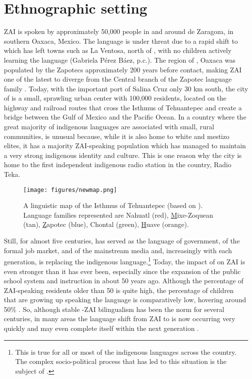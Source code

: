 \section{Ethnographic setting}

ZAI is spoken by approximately 50,000 people in and around  de Zaragoza, in southern Oaxaca, Mexico. The language is under threat due to a rapid shift to  which has left towns such as La Ventosa, north of , with no children actively learning the language (Gabriela P\'{e}rez B\'{a}ez, p.c.). The region of , Oaxaca was populated by the Zapotecs approximately 200 years before  contact, making ZAI one of the latest to diverge from the Central branch of the Zapotec language family \citep{rendon1995}. Today, with the important port of Salina Cruz only 30 km south, the city of  is a small, sprawling urban center with 100,000 residents, located on the highway and railroad routes that cross the Isthmus of Tehuantepec and create a bridge between the Gulf of Mexico and the Pacific Ocean. In a country where the great majority of indigenous languages are associated with small, rural communities,  is unusual because, while it is also home to white and mestizo elites, it has a majority ZAI-speaking population which has managed to maintain a very strong indigenous identity and culture. This is one reason why the city is home to the first independent indigenous radio station in the country, Radio Teka. 

\begin{figure}
\texttt{[image: figures/newmap.png]}
\caption{{A linguistic map of the Isthmus of Tehuantepec (based on \citealt{lewis2016})}. Language families represented are
Nahuatl (red),
\ul{M}ixe-Zoquean (tan),
\ul{Z}apotec (blue),
Chontal (green),
\ul{H}uave (orange).
}
\end{figure}


\largerpage[-1]
Still, for almost five centuries,  has served as the language of government, of the formal job market, and of the mainstream media and, increasingly with each generation, is replacing the indigenous language.\footnote{This is true for all or most of the indigenous languages across the country. The complex socio-political process that has led to this situation is the subject of \citet{heath1972}.}  Today, the impact of  on ZAI is even stronger than it has ever been, especially since the expansion of the public school system and instruction in  about 50 years ago. Although the percentage of ZAI-speaking residents older than 50 is quite high, the percentage of children that are growing up speaking the language is comparatively low, hovering around 50\% \citep{augsburger2004}. So, although stable -ZAI bilingualism has been the norm for several centuries, in many areas the language shift from ZAI to  is now occurring very quickly and may even complete itself within the next generation \citep{augsburger2004}.

